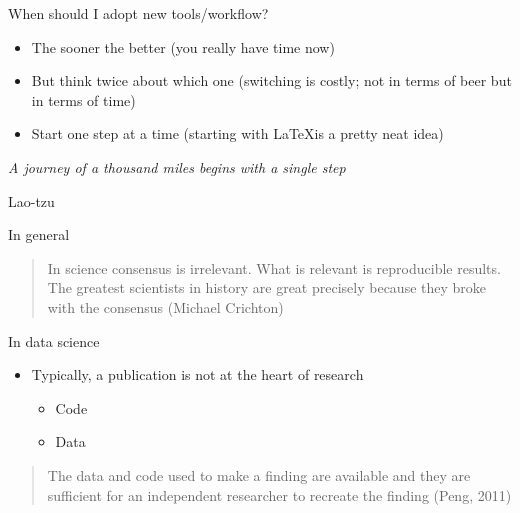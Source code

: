 \documentclass[ignorenonframetext,]{beamer}
\begin{document}
\begin{frame}{When should I adopt new tools/workflow?}

\begin{itemize}
\itemsep1pt\parskip0pt
\item
  The sooner the better (you really have time now)
\item
  But think twice about which one (switching is costly; not in terms of
  beer but in terms of time)
\item
  Start one step at a time (starting with \LaTeX is a pretty neat idea)
\end{itemize}

\emph{A journey of a thousand miles begins with a single step}

Lao-tzu

\end{frame}

\begin{frame}{In general}

\begin{quote}
In science consensus is irrelevant. What is relevant is reproducible
results. The greatest scientists in history are great precisely because
they broke with the consensus (Michael Crichton)
\end{quote}

\end{frame}

\begin{frame}{In data science}

\begin{itemize}
\item
  Typically, a publication is not at the heart of research

  \begin{itemize}
  \itemsep1pt\parskip0pt
  \item
    Code
  \item
    Data
  \end{itemize}
\end{itemize}

\begin{quote}
The data and code used to make a finding are available and they are
sufficient for an independent researcher to recreate the finding (Peng,
2011)
\end{quote}

\end{frame}
\end{document}
